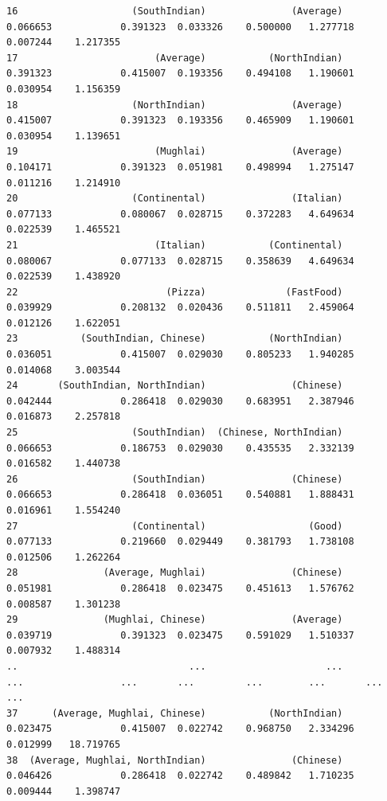 \documentclass[11pt]{article} %
\begin{document}
\begin{lstlisting}
16                    (SouthIndian)               (Average)            0.066653            0.391323  0.033326    0.500000   1.277718  0.007244    1.217355
17                        (Average)           (NorthIndian)            0.391323            0.415007  0.193356    0.494108   1.190601  0.030954    1.156359
18                    (NorthIndian)               (Average)            0.415007            0.391323  0.193356    0.465909   1.190601  0.030954    1.139651
19                        (Mughlai)               (Average)            0.104171            0.391323  0.051981    0.498994   1.275147  0.011216    1.214910
20                    (Continental)               (Italian)            0.077133            0.080067  0.028715    0.372283   4.649634  0.022539    1.465521
21                        (Italian)           (Continental)            0.080067            0.077133  0.028715    0.358639   4.649634  0.022539    1.438920
22                          (Pizza)              (FastFood)            0.039929            0.208132  0.020436    0.511811   2.459064  0.012126    1.622051
23           (SouthIndian, Chinese)           (NorthIndian)            0.036051            0.415007  0.029030    0.805233   1.940285  0.014068    3.003544
24       (SouthIndian, NorthIndian)               (Chinese)            0.042444            0.286418  0.029030    0.683951   2.387946  0.016873    2.257818
25                    (SouthIndian)  (Chinese, NorthIndian)            0.066653            0.186753  0.029030    0.435535   2.332139  0.016582    1.440738
26                    (SouthIndian)               (Chinese)            0.066653            0.286418  0.036051    0.540881   1.888431  0.016961    1.554240
27                    (Continental)                  (Good)            0.077133            0.219660  0.029449    0.381793   1.738108  0.012506    1.262264
28               (Average, Mughlai)               (Chinese)            0.051981            0.286418  0.023475    0.451613   1.576762  0.008587    1.301238
29               (Mughlai, Chinese)               (Average)            0.039719            0.391323  0.023475    0.591029   1.510337  0.007932    1.488314
..                              ...                     ...                 ...                 ...       ...         ...        ...       ...         ...
37      (Average, Mughlai, Chinese)           (NorthIndian)            0.023475            0.415007  0.022742    0.968750   2.334296  0.012999   18.719765
38  (Average, Mughlai, NorthIndian)               (Chinese)            0.046426            0.286418  0.022742    0.489842   1.710235  0.009444    1.398747

\end{lstlisting}
\end{document}
